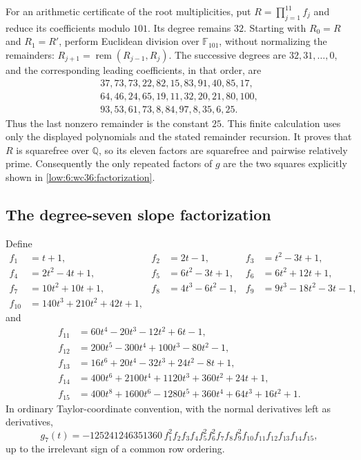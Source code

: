 \documentclass[11pt]{amsart}
\theoremstyle{definition}
\theoremstyle{remark}
\numberwithin{equation}{section}
\begin{document}
For an arithmetic certificate of the root multiplicities, put $R=\prod_{j=1}^{11}f_j$ and reduce its coefficients modulo $101$. Its degree remains $32$. Starting with $R_0=R$ and $R_1=R'$, perform Euclidean division over $\mathbb F_{101}$, without normalizing the remainders: $R_{j+1}=\operatorname{rem}(R_{j-1},R_j)$. The successive degrees are $32,31,\ldots,0$, and the corresponding leading coefficients, in that order, are
\[
\begin{gathered}
37,73,73,22,82,15,83,91,40,85,17,\\
64,46,24,65,19,11,32,20,21,80,100,\\
93,53,61,73,8,84,97,8,35,6,25.
\end{gathered}
\]
Thus the last nonzero remainder is the constant $25$. This finite calculation uses only the displayed polynomials and the stated remainder recursion. It proves that $R$ is squarefree over $\mathbb Q$, so its eleven factors are squarefree and pairwise relatively prime. Consequently the only repeated factors of $g$ are the two squares explicitly shown in \eqref{low:6:wc36:factorization}.


\subsection{The degree-seven slope factorization}\label{supp:g7-factors}
Define
\begin{align*}
f_1&=t+1,& f_2&=2t-1,& f_3&=t^2-3t+1,\\
f_4&=2t^2-4t+1,& f_5&=6t^2-3t+1,& f_6&=6t^2+12t+1,\\
f_7&=10t^2+10t+1,& f_8&=4t^3-6t^2-1,& f_9&=9t^3-18t^2-3t-1,\\
f_{10}&=140t^3+210t^2+42t+1,&&&&
\end{align*}
and
\begin{align*}
f_{11}&=60t^4-20t^3-12t^2+6t-1,\\
f_{12}&=200t^5-300t^4+100t^3-80t^2-1,\\
f_{13}&=16t^6+20t^4-32t^3+24t^2-8t+1,\\
f_{14}&=400t^6+2100t^4+1120t^3+360t^2+24t+1,\\
f_{15}&=400t^8+1600t^6-1280t^5+360t^4+64t^3+16t^2+1.
\end{align*}
In ordinary Taylor-coordinate convention, with the normal derivatives left as derivatives,
\begin{equation}\label{low:78:h3n:g7-factor}
g_7(t)=-125241246351360\,f_1^2f_2f_3f_4f_5^2f_6^2f_7f_8f_9^2f_{10}f_{11}f_{12}f_{13}f_{14}f_{15},
\end{equation}
up to the irrelevant sign of a common row ordering.
\end{document}
